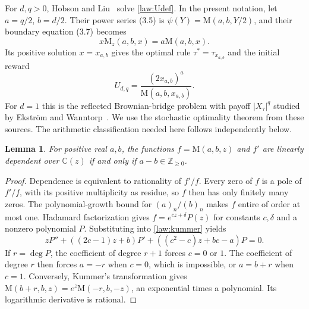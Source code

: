 \documentclass[11pt,a4paper]{article}
\newcommand{\C}{\mathbb C}
\newcommand{\M}{\mathrm M}
\newtheorem{lemma}[theorem]{Lemma}
\theoremstyle{definition}
\theoremstyle{remark}
\numberwithin{equation}{section}
\begin{document}
For $d,q>0$, Hobson and Liu~\cite[Corollary 3.1 and Theorem 3.1]{HL}
solve \eqref{law:Udef}. In the present notation, let $a=q/2$, $b=d/2$.
Their power series (3.5) is $\psi(Y)=\M(a,b,Y/2)$, and their boundary
equation (3.7) becomes
\begin{equation}\label{law:boundary}
 x\M_z(a,b,x)=a\M(a,b,x).
\end{equation}
Its positive solution $x=x_{a,b}$ gives the optimal rule
$\tau^*=\tau_{x_{a,b}}$ and the initial reward
\begin{equation}\label{law:optimalvalue}
 U_{d,q}=\frac{(2x_{a,b})^a}{\M(a,b,x_{a,b})}.
\end{equation}
For $d=1$ this is the reflected Brownian-bridge problem with payoff
$|X_\tau|^q$ studied by Ekstr\"om and Wanntorp~\cite{EW}.
We use the stochastic optimality theorem from these sources. The
arithmetic classification needed here follows independently below.

\begin{lemma}\label{law:logderivative}\label{opt:logderivative}
For positive real $a,b$, the functions $f=\M(a,b,z)$ and $f'$ are
linearly dependent over $\C(z)$ if and only if
$a-b\in\mathbb Z_{\geq0}$.
\end{lemma}
\begin{proof}
Dependence is equivalent to rationality of $f'/f$. Every zero of $f$
is a pole of $f'/f$, with its positive multiplicity as residue, so
$f$ then has only finitely many zeros. The polynomial-growth bound
for $(a)_n/(b)_n$ makes $f$ entire of order at most one.
Hadamard factorization gives $f=e^{cz+\delta}P(z)$ for constants
$c,\delta$ and a nonzero polynomial $P$. Substituting into
\eqref{law:kummer} yields
\[
 zP''+((2c-1)z+b)P'
 +((c^2-c)z+bc-a)P=0.
\]
If $r=\deg P$, the coefficient of degree $r+1$ forces $c=0$ or $1$.
The coefficient of degree $r$ then forces $a=-r$ when $c=0$, which
is impossible, or $a=b+r$ when $c=1$.
Conversely, Kummer's transformation gives
$\M(b+r,b,z)=e^z\M(-r,b,-z)$, an exponential times a polynomial.
Its logarithmic derivative is rational.
\end{proof}
\end{document}
